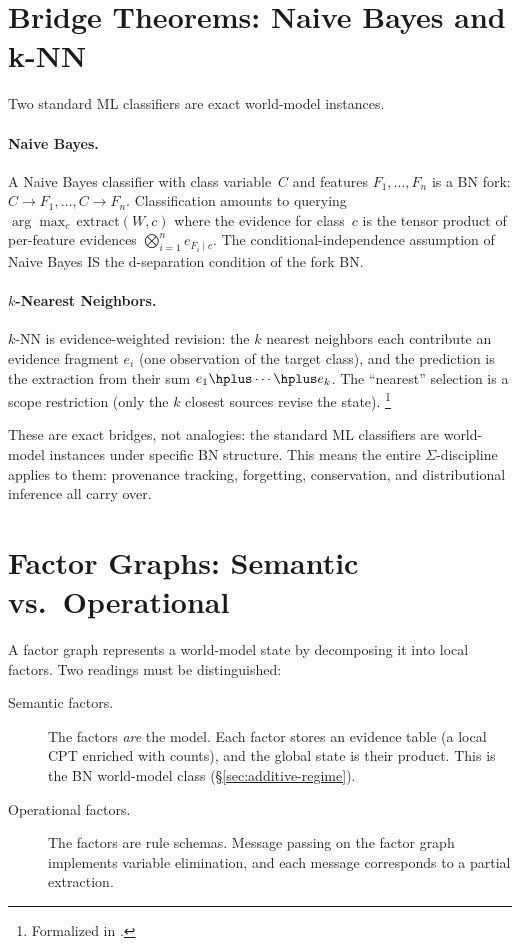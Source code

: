 \documentclass[11pt,openany]{report}
\begin{document}
\section{Bridge Theorems: Naive Bayes and k-NN}
\label{sec:bridge-nb-knn}

Two standard ML classifiers are exact world-model instances.

\paragraph{Naive Bayes.}
A Naive Bayes classifier with class variable~$C$ and features
$F_1, \ldots, F_n$ is a BN fork: $C \to F_1, \ldots, C \to F_n$.
Classification amounts to querying
$\arg\max_c \,\mathrm{extract}(W, c)$ where the evidence for class~$c$
is the tensor product of per-feature evidences
$\bigotimes_{i=1}^n e_{F_i \mid c}$.  The conditional-independence
assumption of Naive Bayes IS the d-separation condition of the fork BN.

\paragraph{$k$-Nearest Neighbors.}
$k$-NN is evidence-weighted revision: the $k$ nearest neighbors each
contribute an evidence fragment $e_i$ (one observation of the target
class), and the prediction is the extraction from their sum
$e_1 \hplus \cdots \hplus e_k$.  The ``nearest'' selection is a scope
restriction (only the $k$ closest sources revise the state).%
\footnote{Formalized in
.}

\noindent
These are exact bridges, not analogies: the standard ML classifiers
are world-model instances under specific BN structure.  This means
the entire $\Sigma$-discipline applies to them: provenance tracking,
forgetting, conservation, and distributional inference all carry
over.


\section{Factor Graphs: Semantic vs.\ Operational}

A factor graph represents a world-model state by decomposing it into
local factors.  Two readings must be distinguished:

\begin{description}
\item[Semantic factors.] The factors \emph{are} the model.  Each factor
  stores an evidence table (a local CPT enriched with counts), and the
  global state is their product.  This is the BN world-model class
  (\S\ref{sec:additive-regime}).

\item[Operational factors.] The factors are rule schemas.  Message
  passing on the factor graph implements variable elimination, and each
  message corresponds to a partial extraction.
\end{description}
\end{document}
